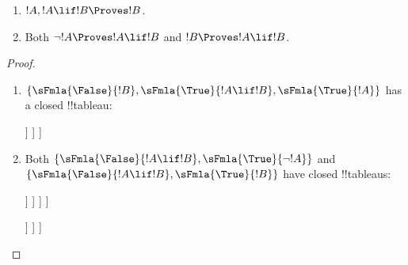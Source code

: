 \begin{prop}
  \begin{enumerate}
  \item {}  $!A, !A \lif !B \Proves !B$.
  \item {}
    Both $\lnot !A \Proves !A \lif !B$ and $!B \Proves !A \lif !B$.
  \end{enumerate}
\end{prop}

\begin{proof}
  \begin{enumerate}
    \item $\{\sFmla{\False}{!B}, \sFmla{\True}{!A \lif !B},
      \sFmla{\True}{!A}\}$ has a closed !!{tableau}:
      \begin{oltableau}
        [\sFmla{\False}{\formula{B}}, just=\TAss
          [\sFmla{\True}{\formula{A} \lif \formula{B}}, just=\TAss
            [\sFmla{\True}{\formula{A}}, just=\TAss
              [\sFmla{\False}{\formula{A}}, just = {\TRule{\True}{\lif}[2]}, close]
              [\sFmla{\True}{\formula{B}}, just = {\TRule{\True}{\lif}[2]}, close]
            ]
          ]
        ]
      \end{oltableau}
    \item Both $\{\sFmla{\False}{!A \lif !B},
      \sFmla{\True}{\lnot !A}\}$ and $\{\sFmla{\False}{!A \lif !B},
      \sFmla{\True}{!B}\}$ have closed !!{tableau}s:
      \begin{oltableau}
        [\sFmla{\False}{\formula{A} \lif \formula{B}}, just = \TAss
          [\sFmla{\True}{\lnot \formula{A}}, just = \TAss
            [\sFmla{\True}{\formula{A}}, just = {\TRule{\False}{\lif}[1]}
              [\sFmla{\False}{\formula{B}}, just = {\TRule{\False}{\lif}[1]}
                [\sFmla{\False}{\formula{A}}, just = {\TRule{\True}{\lnot}[2]}, close]
              ]
            ]
          ]
        ]
      \end{oltableau}
      \begin{oltableau}
        [\sFmla{\False}{\formula{A} \lif \formula{B}}, just = \TAss
          [\sFmla{\True}{\formula{B}}, just = \TAss
            [\sFmla{\True}{\formula{A}}, just = {\TRule{\False}{\lif}[1]}
              [\sFmla{\False}{\formula{B}}, just = {\TRule{\False}{\lif}[1]},close
              ]
            ]
          ]
        ]
      \end{oltableau}
  \end{enumerate}
\end{proof}





